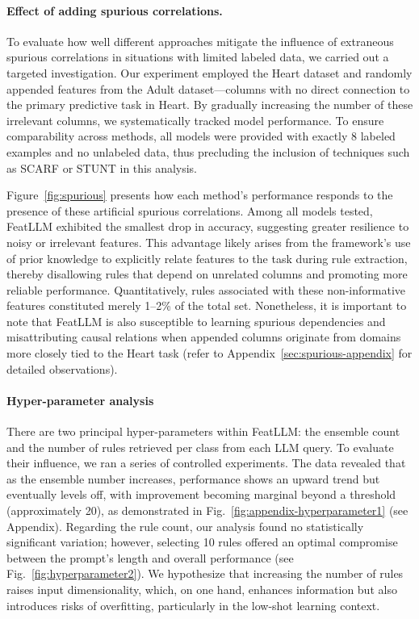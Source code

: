 \vspace*{-0.12in}
\paragraph{Effect of adding spurious correlations.} To evaluate how well different approaches mitigate the influence of extraneous spurious correlations in situations with limited labeled data, we carried out a targeted investigation. Our experiment employed the Heart dataset and randomly appended features from the Adult dataset—columns with no direct connection to the primary predictive task in Heart. By gradually increasing the number of these irrelevant columns, we systematically tracked model performance. To ensure comparability across methods, all models were provided with exactly 8 labeled examples and no unlabeled data, thus precluding the inclusion of techniques such as SCARF or STUNT in this analysis.

Figure~\ref{fig:spurious} presents how each method's performance responds to the presence of these artificial spurious correlations. Among all models tested, \textsf{FeatLLM} exhibited the smallest drop in accuracy, suggesting greater resilience to noisy or irrelevant features. This advantage likely arises from the framework’s use of prior knowledge to explicitly relate features to the task during rule extraction, thereby disallowing rules that depend on unrelated columns and promoting more reliable performance. Quantitatively, rules associated with these non-informative features constituted merely 1–2\% of the total set. Nonetheless, it is important to note that \textsf{FeatLLM} is also susceptible to learning spurious dependencies and misattributing causal relations when appended columns originate from domains more closely tied to the Heart task (refer to Appendix~\ref{sec:spurious-appendix} for detailed observations).

\vspace*{-0.12in}
\paragraph{Hyper-parameter analysis}
There are two principal hyper-parameters within \textsf{FeatLLM}: the ensemble count and the number of rules retrieved per class from each LLM query. To evaluate their influence, we ran a series of controlled experiments. The data revealed that as the ensemble number increases, performance shows an upward trend but eventually levels off, with improvement becoming marginal beyond a threshold (approximately 20), as demonstrated in Fig.~\ref{fig:appendix-hyperparameter1} (see Appendix). Regarding the rule count, our analysis found no statistically significant variation; however, selecting 10 rules offered an optimal compromise between the prompt’s length and overall performance (see Fig.~\ref{fig:hyperparameter2}). We hypothesize that increasing the number of rules raises input dimensionality, which, on one hand, enhances information but also introduces risks of overfitting, particularly in the low-shot learning context.

